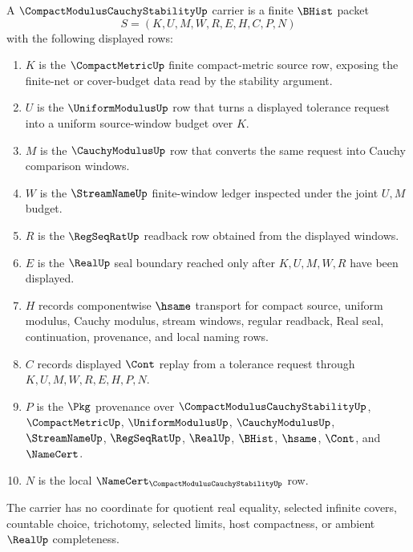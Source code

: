 \begin{definition}
\label{def:compact-modulus-cauchy-stability-carrier}
A $\CompactModulusCauchyStabilityUp$ carrier is a finite $\BHist$ packet
$$
S=(K,U,M,W,R,E,H,C,P,N)
$$
with the following displayed rows:
\begin{enumerate}
\item $K$ is the $\CompactMetricUp$ finite compact-metric source row, exposing the finite-net or cover-budget data read by the stability argument.
\item $U$ is the $\UniformModulusUp$ row that turns a displayed tolerance request into a uniform source-window budget over $K$.
\item $M$ is the $\CauchyModulusUp$ row that converts the same request into Cauchy comparison windows.
\item $W$ is the $\StreamNameUp$ finite-window ledger inspected under the joint $U,M$ budget.
\item $R$ is the $\RegSeqRatUp$ readback row obtained from the displayed windows.
\item $E$ is the $\RealUp$ seal boundary reached only after $K,U,M,W,R$ have been displayed.
\item $H$ records componentwise $\hsame$ transport for compact source, uniform modulus, Cauchy modulus, stream windows, regular readback, Real seal, continuation, provenance, and local naming rows.
\item $C$ records displayed $\Cont$ replay from a tolerance request through $K,U,M,W,R,E,H,P,N$.
\item $P$ is the $\Pkg$ provenance over $\CompactModulusCauchyStabilityUp$, $\CompactMetricUp$, $\UniformModulusUp$, $\CauchyModulusUp$, $\StreamNameUp$, $\RegSeqRatUp$, $\RealUp$, $\BHist$, $\hsame$, $\Cont$, and $\NameCert$.
\item $N$ is the local $\NameCert_{\CompactModulusCauchyStabilityUp}$ row.
\end{enumerate}
The carrier has no coordinate for quotient real equality, selected infinite covers, countable choice, trichotomy, selected limits, host compactness, or ambient $\RealUp$ completeness.
\end{definition}

